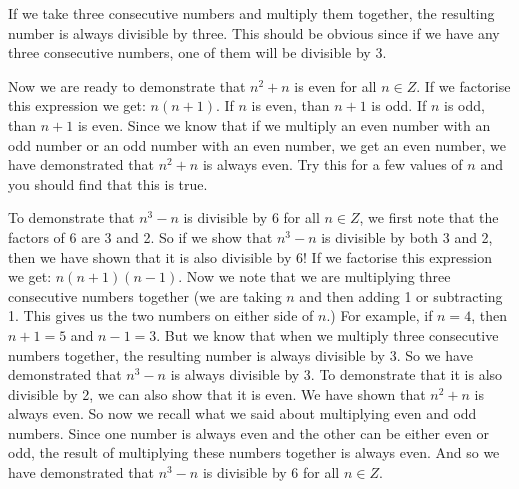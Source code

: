     \par
  \label{m39392*id697}If we take three consecutive numbers and multiply them together, the resulting number is always divisible by three. This should be obvious since if we have any three consecutive numbers, one of them will be divisible by 3.
\par 
\label{m39392*id67354}Now we are ready to demonstrate that ${n}^{2}+n$ is even for all $n\in {Z}$. If we factorise this expression we get:
$n\left(n+1\right)$. If $n$ is even, than $n+1$ is odd. If $n$ is odd, than $n+1$ is even. Since we know that if we multiply an even number with an odd number or an odd number with an even number, we get an even number, we have demonstrated that ${n}^{2}+n$ is always even. Try this for a few values of $n$ and you should find that this is true.
\par 
\label{m39392*id67744}To demonstrate that ${n}^{3}-n$ is divisible by 6 for all $n\in {Z}$, we first note that the factors of 6 are 3 and 2. So if we show that ${n}^{3}-n$ is divisible by both 3 and 2, then we have shown that it is also divisible by 6! If we factorise this expression we get:
$n\left(n+1\right)\left(n-1\right)$. Now we note that we are multiplying three consecutive numbers together (we are taking $n$ and then adding 1 or subtracting 1. This gives us the two numbers on either side of $n$.) For example, if $n=4$, then $n+1=5$ and $n-1=3$. But we know that when we multiply three consecutive numbers together, the resulting number is always divisible by 3. So we have demonstrated that ${n}^{3}-n$ is always divisible by 3. To demonstrate that it is also divisible by 2, we can also show that it is even. We have shown that ${n}^{2}+n$ is always even. So now we recall what we said about multiplying even and odd numbers. Since one number is always even and the other can be either even or odd, the result of multiplying these numbers together is always even. And so we have demonstrated that ${n}^{3}-n$ is divisible by 6 for all $n\in {Z}$.
\par 
\label{m39392*eip-735}
